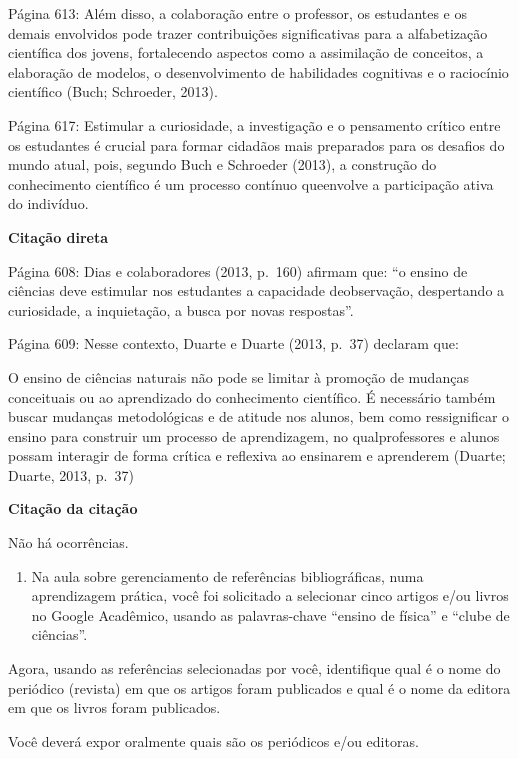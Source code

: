 \documentclass[
  letterpaper,
  DIV=11,
  numbers=noendperiod]{scrreprt}
\providecommand{\tightlist}{%
  \setlength{\itemsep}{0pt}\setlength{\parskip}{0pt}}
\begin{document}
Página 613: Além disso, a colaboração entre o professor, os estudantes e
os demais envolvidos pode trazer contribuições significativas para a
alfabetização científica dos jovens, fortalecendo aspectos como a
assimilação de conceitos, a elaboração de modelos, o desenvolvimento de
habilidades cognitivas e o raciocínio científico (Buch; Schroeder,
2013).

Página 617: Estimular a curiosidade, a investigação e o pensamento
crítico entre os estudantes é crucial para formar cidadãos mais
preparados para os desafios do mundo atual, pois, segundo Buch e
Schroeder (2013), a construção do conhecimento científico é um processo
contínuo queenvolve a participação ativa do indivíduo.

\textbf{Citação direta}

Página 608: Dias e colaboradores (2013, p.~160) afirmam que: ``o ensino
de ciências deve estimular nos estudantes a capacidade deobservação,
despertando a curiosidade, a inquietação, a busca por novas respostas''.

Página 609: Nesse contexto, Duarte e Duarte (2013, p.~37) declaram que:

O ensino de ciências naturais não pode se limitar à promoção de mudanças
conceituais ou ao aprendizado do conhecimento científico. É necessário
também buscar mudanças metodológicas e de atitude nos alunos, bem como
ressignificar o ensino para construir um processo de aprendizagem, no
qualprofessores e alunos possam interagir de forma crítica e reflexiva
ao ensinarem e aprenderem (Duarte; Duarte, 2013, p.~37)

\textbf{Citação da citação}

Não há ocorrências.

\begin{enumerate}
\def\labelenumi{\arabic{enumi}.}
\setcounter{enumi}{2}
\tightlist
\item
  Na aula sobre gerenciamento de referências bibliográficas, numa
  aprendizagem prática, você foi solicitado a selecionar cinco artigos
  e/ou livros no Google Acadêmico, usando as palavras-chave ``ensino de
  física'' e ``clube de ciências''.
\end{enumerate}

Agora, usando as referências selecionadas por você, identifique qual é o
nome do periódico (revista) em que os artigos foram publicados e qual é
o nome da editora em que os livros foram publicados.

Você deverá expor oralmente quais são os periódicos e/ou editoras.
\end{document}
